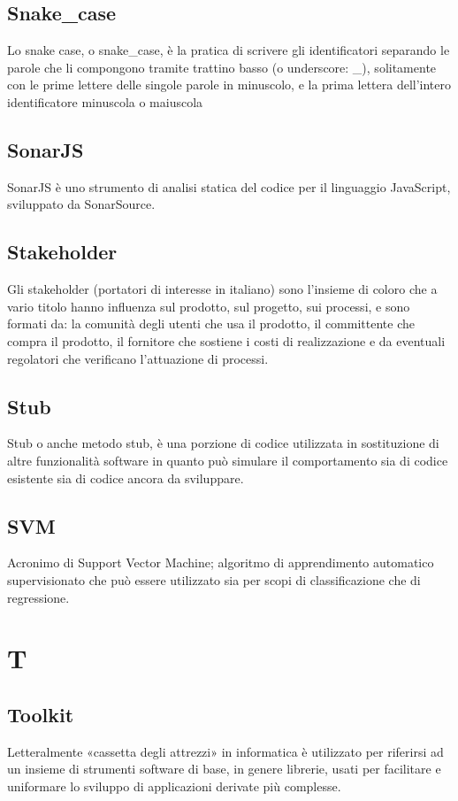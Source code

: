\subsection*{Snake\_case}
Lo snake case, o snake\_case, è la pratica di scrivere gli identificatori separando le parole che li compongono tramite trattino basso (o underscore: \_), solitamente con le prime lettere delle singole parole in minuscolo, e la prima lettera dell'intero identificatore minuscola o maiuscola

\subsection*{SonarJS}
SonarJS è uno strumento di analisi statica del codice per il linguaggio JavaScript, sviluppato da SonarSource.

\subsection*{Stakeholder}
Gli stakeholder (portatori di interesse in italiano) sono l’insieme di coloro che a vario titolo hanno influenza sul prodotto, sul progetto, sui processi, e sono formati da: la comunità degli utenti che usa il prodotto, il committente che compra il prodotto, il fornitore che sostiene i costi di realizzazione e da eventuali regolatori che verificano l’attuazione di processi.

\subsection*{Stub}
Stub o anche metodo stub, è una porzione di codice utilizzata in sostituzione di altre funzionalità software in quanto può simulare il comportamento sia di codice esistente sia di codice ancora da sviluppare.

\subsection*{SVM}
Acronimo di Support Vector Machine; algoritmo di apprendimento automatico supervisionato che può essere utilizzato sia per scopi di classificazione che di regressione.

\clearpage
\section*{T}

\subsection*{Toolkit}
Letteralmente «cassetta degli attrezzi» in informatica è utilizzato per riferirsi ad un insieme di strumenti software di base, in genere librerie, usati per facilitare e uniformare lo sviluppo di applicazioni derivate più complesse. 

